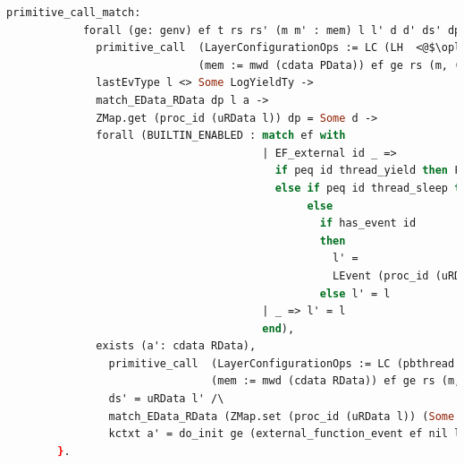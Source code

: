 \begin{lstlisting}[language=Caml]     
          primitive_call_match:
            forall (ge: genv) ef t rs rs' (m m' : mem) l l' d d' ds' dp (a: cdata RData),
              primitive_call  (LayerConfigurationOps := LC (LH  <@$\oplus$@>  L64))  
                              (mem := mwd (cdata PData)) ef ge rs (m, (uRData l, d)) t rs' (m', (ds', d')) ->
              lastEvType l <> Some LogYieldTy ->
              match_EData_RData dp l a ->
              ZMap.get (proc_id (uRData l)) dp = Some d ->
              forall (BUILTIN_ENABLED : match ef with
                                        | EF_external id _ => 
                                          if peq id thread_yield then False
                                          else if peq id thread_sleep then False
                                               else
                                                 if has_event id
                                                 then
                                                   l' =
                                                   LEvent (proc_id (uRData l)) (LogPrim id nil 0 (snap_func d)) :: l
                                                 else l' = l
                                        | _ => l' = l
                                        end),
              exists (a': cdata RData),
                primitive_call  (LayerConfigurationOps := LC (pbthread  <@$\oplus$@>  L64)) 
                                (mem := mwd (cdata RData)) ef ge rs (m, a) t rs' (m', a') /\
                ds' = uRData l' /\
                match_EData_RData (ZMap.set (proc_id (uRData l)) (Some d') dp) l' a' /\
                kctxt a' = do_init ge (external_function_event ef nil l 0 (snap_func d)) l (kctxt a)
        }.
\end{lstlisting}

